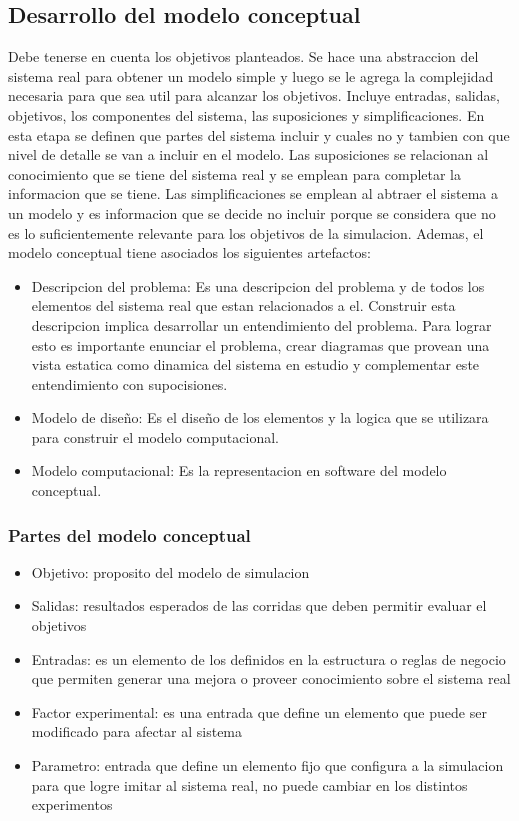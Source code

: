 \documentclass[a4paper]{article}
\begin{document}
\subsection*{Desarrollo del modelo conceptual}
Debe tenerse en cuenta los objetivos planteados. Se hace una abstraccion del 
sistema real para obtener un modelo simple y luego se le agrega la complejidad 
necesaria para que sea util para alcanzar los objetivos.
Incluye entradas, salidas, objetivos, los componentes del sistema, las suposiciones
y simplificaciones. En esta etapa se definen que partes del sistema incluir y cuales 
no y tambien con que nivel de detalle se van a incluir en el modelo.
Las suposiciones se relacionan al conocimiento que se tiene del sistema real y se 
emplean para completar la informacion que se tiene. Las simplificaciones se 
emplean al abtraer el sistema a un modelo y es informacion que se decide no incluir
porque se considera que no es lo suficientemente relevante para los objetivos de la simulacion.
Ademas, el modelo conceptual tiene asociados los siguientes artefactos:

\begin{itemize}
    \item Descripcion del problema: Es una descripcion del problema y de todos los elementos del sistema real 
    que estan relacionados a el. Construir esta descripcion implica desarrollar un entendimiento del problema.
    Para lograr esto es importante enunciar el problema, crear diagramas que provean una vista estatica como 
    dinamica del sistema en estudio y complementar este entendimiento con supocisiones.
    \item Modelo de diseño: Es el diseño de los elementos y la logica que se utilizara para construir 
    el modelo computacional.
    \item Modelo computacional: Es la representacion en software del modelo conceptual.
\end{itemize}

\subsubsection*{Partes del modelo conceptual}
\begin{itemize}
    \item Objetivo: proposito del modelo de simulacion
    \item Salidas: resultados esperados de las corridas que deben permitir evaluar el objetivos
    \item Entradas: es un elemento de los definidos en la estructura o reglas de negocio que permiten
    generar una mejora o proveer conocimiento sobre el sistema real
    \item Factor experimental: es una entrada que define un elemento que puede ser modificado para afectar 
    al sistema
    \item Parametro: entrada que define un elemento fijo que configura a la simulacion para que logre imitar 
    al sistema real, no puede cambiar en los distintos experimentos
\end{itemize}
\end{document}
